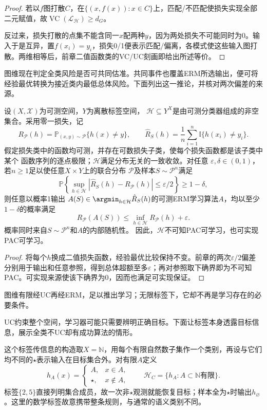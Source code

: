 \begin{proof}
若以$f$图打散$C$，在$\{(x,f(x)):x\in C\}$上，匹配/不匹配使损失实现全部二元赋值，故$\operatorname{VC}(\mathcal L_{\mathcal H})\geq d_G$。

反过来，损失打散的点集不能含同一$x$配两种$y$，因为两处损失不可能同时为0。输入于是互异，置$f(x_i)=y_i$，损失0/1便表示匹配/偏离，各模式使这些输入图打散。两维相等后，前章二值函数类的VC/UC刻画即给出所述等价。
\end{proof}

图维现在判定全类风险是否可共同估准。共同事件也覆盖ERM所选输出，便可将经验最优转换为接近类内最低总体风险。下面列出这一推论，并核对两次偏差的来源。

\begin{theorem}[一致收敛推出可学习性]
\label{thm:multiclass-uniform-pac}
设$(X,\mathcal X)$为可测空间，$Y$为离散标签空间，
$\mathcal H\subseteq Y^X$是由可测分类器组成的非空集合。采用零一损失，记
\[
 R_{\mathcal P}(h)=\mathbb P_{(x,y)\sim\mathcal P}\{h(x)\neq y\},\qquad
 \hat R_S(h)=\frac1n\sum_{i=1}^n\mathbb I\{h(x_i)\neq y_i\}.
\]
假定损失类中的函数均可测，并存在可数损失子类，使每个损失函数都是该子类中某个
函数序列的逐点极限；$\mathcal H$满足分布无关的一致收敛。对任意
$\varepsilon,\delta\in(0,1)$，若$n\geq1$足以使任意$X\times Y$上的联合分布
$\mathcal P$及样本$S\sim\mathcal P^n$满足
\[
 \mathbb P\!\left\{
 \sup_{h\in\mathcal H}|\hat R_S(h)-R_{\mathcal P}(h)|\leq\varepsilon/2
 \right\}\geq1-\delta,
\]
则任意以概率1输出
$A(S)\in\argmin_{h\in\mathcal H}\hat R_S(h)$的可测ERM学习算法$A$，均以至少
$1-\delta$的概率满足
\[
 R_{\mathcal P}(A(S))\leq\inf_{h\in\mathcal H}R_{\mathcal P}(h)+\varepsilon.
\]
概率同时来自$S\sim\mathcal P^n$和$A$的内部随机性。
因此，$\mathcal H$不可知PAC可学习，也可实现PAC可学习。
\end{theorem}

\begin{proof}
将每个$h$换成二值损失函数，经验最优比较保持不变。前章的两次$\varepsilon/2$偏差分别用于输出和任意参照，得到总体超额至多$\varepsilon$；再对参照取下确界即为不可知PAC。可实现来源使该下确界为0，因而也满足可实现保证。
\end{proof}

图维有限经UC再经ERM，足以推出学习；无限标签下，它却不再是学习存在的必要条件。

UC约束整个空间，学习器可能只需要辨明正确目标。下面让标签本身透露目标信息，展示全类不UC却有成功算法的情形。

这个标签传信息的构造取$X=\mathbb N$，用每个有限自然数子集作一个类别，再设与它们均不同的$\star$表示输入在目标集合外。对有限$A$定义
\begin{equation}
 h_A(x)=\begin{cases}A,&x\in A,\\\star,&x\notin A,\end{cases}
 \qquad\mathcal H_C=\{h_A:A\subset\mathbb N\text{有限}\}.
 \label{eq:cantor-class}
\end{equation}
标签$\{2,5\}$直接列明集合成员，故一次非$\star$观测就能恢复目标；样本全为$\star$时输出$h_{\varnothing}$。这里的数学标签故意携带整条规则，与通常的语义类别不同。

